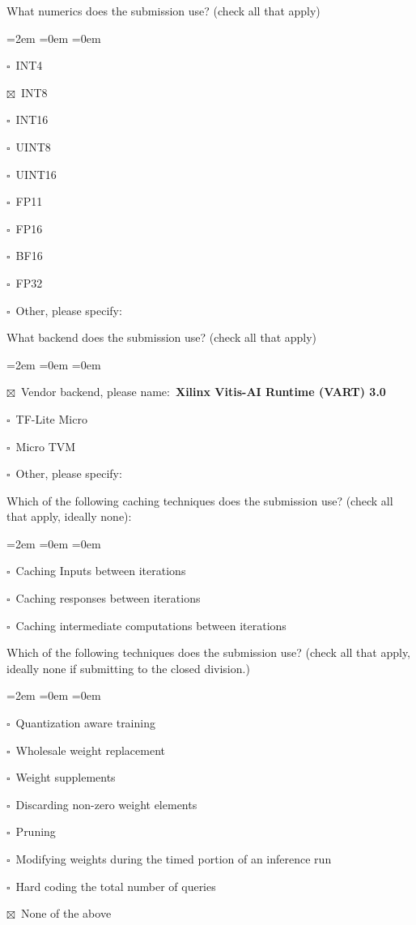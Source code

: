 \documentclass[11pt]{article}
\newcommand{\cb}{$\square$~}            %
\newcommand{\cbx}{$\boxtimes$~}         %
\begin{document}
What numerics does the submission use? (check all that apply)
\begin{list}{}{\leftmargin=2em \itemsep=0em \topsep=0em}
\item \cb  INT4
\item \cbx INT8
\item \cb  INT16
\item \cb  UINT8
\item \cb  UINT16
\item \cb  FP11
\item \cb  FP16
\item \cb  BF16
\item \cb  FP32
\item \cb  Other, please specify:
\end{list}

What backend does the submission use? (check all that apply)
\begin{list}{}{\leftmargin=2em \itemsep=0em \topsep=0em}
\item \cbx Vendor backend, please name:\ \textbf{Xilinx Vitis-AI Runtime (VART) 3.0}
\item \cb  TF-Lite Micro
\item \cb  Micro TVM
\item \cb  Other, please specify:
\end{list}

\clearpage

Which of the following caching techniques does the submission use? (check
all that apply, ideally none):
\begin{list}{}{\leftmargin=2em \itemsep=0em \topsep=0em}
\item \cb Caching Inputs between iterations
\item \cb Caching responses between iterations
\item \cb Caching intermediate computations between iterations
\end{list}

Which of the following techniques does the submission use? (check all that
apply, ideally none if submitting to the closed division.)
\begin{list}{}{\leftmargin=2em \itemsep=0em \topsep=0em}
\item \cb  Quantization aware training
\item \cb  Wholesale weight replacement
\item \cb  Weight supplements
\item \cb  Discarding non-zero weight elements
\item \cb  Pruning
\item \cb  Modifying weights during the timed portion of an inference run
\item \cb  Hard coding the total number of queries
\item \cbx None of the above
\end{list}
\end{document}
